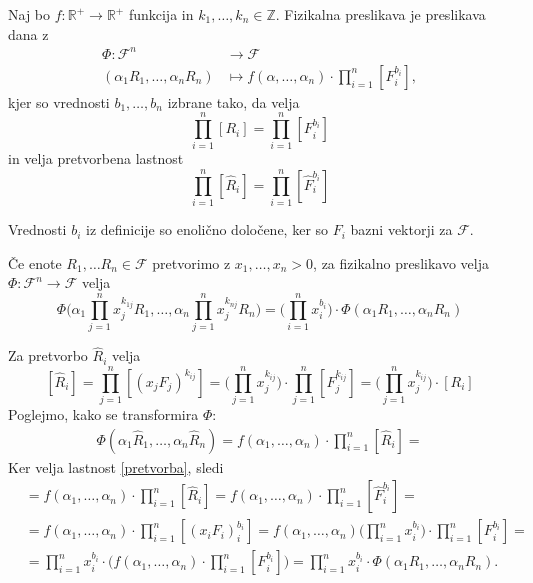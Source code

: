 \documentclass[mat2, tisk]{fmfdelo}
\newcommand{\R}{\mathbb R}
\newcommand{\Z}{\mathbb Z}
\begin{document}
\begin{definicija}
Naj bo $f: \R^+ \rightarrow \R^+$ funkcija in $k_1, \dots, k_n \in \Z$.
Fizikalna preslikava je preslikava dana z 
\begin{align*}
\Phi: \mathcal{F}^n &\rightarrow \mathcal{F} \\
(\alpha_1 R_1, \dots, \alpha_n R_n) &\mapsto f(\alpha, \dots, \alpha_n)\cdot \prod_{i=1}^{n} [F_i^{b_i}],
\end{align*}
kjer so vrednosti $b_1, \dots, b_n$ izbrane tako, da velja 
$$
\prod_{i=1}^{n} [R_i] = \prod_{i=1}^{n} [F_i^{b_i}]
$$
in velja pretvorbena lastnost 
\begin{equation}
\label{pretvorba}
\prod_{i=1}^{n} [\hat{R}_i] = \prod_{i=1}^{n} [\hat{F}_i^{b_i}]
\end{equation}
\end{definicija}

\begin{opomba}
Vrednosti $b_i$ iz definicije so enolično določene, ker so $F_i$ 
bazni vektorji za $\mathcal{F}$.
\end{opomba}

\begin{lema}
\label{lema_pretvorba}
Če enote $R_1, \dots R_n \in \mathcal{F}$ pretvorimo z $x_1, \dots, x_n > 0$, za 
fizikalno preslikavo velja 
$\Phi: \mathcal{F}^n \rightarrow \mathcal{F}$ velja 
\begin{equation}
\Phi\Big(\alpha_1\prod_{j=1}^n x_j^{k_{1j}} R_1, \dots, \alpha_n \prod_{j=1}^n x_j^{k_{nj}} R_n\Big) = \Big(\prod_{i=1}^n x_i^{b_i}\Big)\cdot \Phi(\alpha_1 R_1, \dots, \alpha_n R_n)
\end{equation}
\end{lema}

\begin{dokaz}
Za pretvorbo $\hat{R}_i$ velja 
$$
[\hat{R}_i] = \prod_{j=1}^n [(x_j F_j)^{k_{ij}}] = \Big(\prod_{j=1}^n x_j^{k_{ij}}\Big)\cdot \prod_{j=1}^n [F_j^{k_{ij}}] = \Big(\prod_{j=1}^n x_j^{k_{ij}}\Big) \cdot [R_i]
$$
Poglejmo, kako se transformira $\Phi$:
\begin{align*}
\Phi(\alpha_1 \hat{R}_1, \dots, \alpha_n \hat{R}_n) = f(\alpha_1, \dots, \alpha_n) \cdot \prod_{i=1}^n [\hat{R}_i] = 
\end{align*}
Ker velja lastnost \ref{pretvorba}, sledi
\begin{align*}
&= f(\alpha_1, \dots, \alpha_n) \cdot \prod_{i=1}^n [\hat{R}_i] = f(\alpha_1, \dots, \alpha_n) \cdot \prod_{i=1}^n [\hat{F}_i^{b_i}] = \\
&= f(\alpha_1, \dots, \alpha_n) \cdot \prod_{i=1}^n [(x_i F_i)_i^{b_i}] = f(\alpha_1, \dots, \alpha_n) \Big(\prod_{i=1}^n x_i^{b_i}\Big) \cdot \prod_{i=1}^n [F_i^{b_i}] = \\
&= \prod_{i=1}^n x_i^{b_i} \cdot \Big(f(\alpha_1, \dots, \alpha_n)\cdot \prod_{i=1}^n [F_i^{b_i}] \Big) = \prod_{i=1}^n x_i^{b_i} \cdot \Phi(\alpha_1 R_1, \dots, \alpha_n R_n).
\end{align*}
\end{dokaz}
\end{document}
